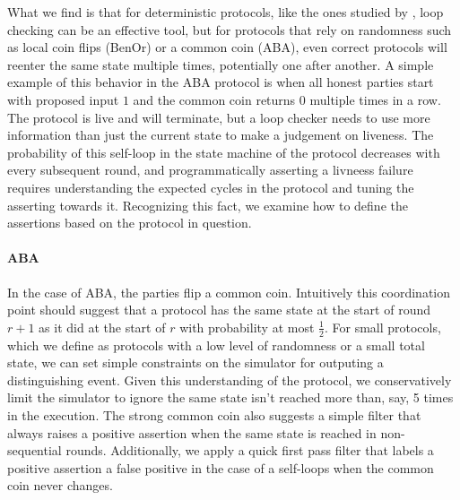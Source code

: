 What we find is that for deterministic protocols, like the ones studied by
\cite{formalbyzantine}, loop checking can be an effective tool, but for
protocols that rely on randomness such as local coin flips (BenOr) or a common
coin (ABA), even correct protocols will reenter the same state multiple times,
potentially one after another.  A simple example of this behavior in the ABA
protocol is when all honest parties start with proposed input $1$ and the
common coin returns $0$ multiple times in a row.  The protocol is live and will
terminate, but a loop checker needs to use more information than just the
current state to make a judgement on liveness.  The probability of this
self-loop in the state machine of the protocol decreases with every subsequent
round, and programmatically asserting a livneess failure requires understanding
the expected cycles in the protocol and tuning the asserting towards it.
Recognizing this fact, we examine how to define the assertions based on the
protocol in question.

\paragraph{ABA}
In the case of ABA, the parties flip a common coin.  Intuitively this
coordination point should suggest that a protocol has the same state at the
start of round $r+1$ as it did at the start of $r$ with probability at most
$\frac{1}{2}$.  For small protocols, which we define as protocols with a low
level of randomness or a small total state, we can set simple constraints on
the simulator for outputing a distinguishing event.  Given this understanding
of the protocol, we conservatively limit the simulator to ignore the same state
isn't reached more than, say, 5 times in the execution.  The strong common coin also
suggests a simple filter that always raises a positive assertion when the same
state is reached in non-sequential rounds.  Additionally, we apply a quick
first pass filter that labels a positive assertion a false positive in the case
of a self-loops when the common coin never changes.

